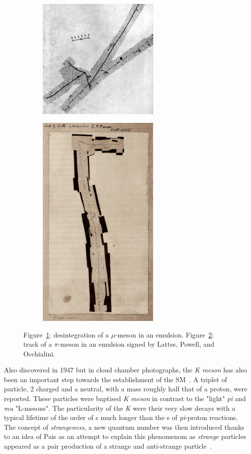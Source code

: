 	\begin{figure}[H]
		\begin{subfigure}{0.5\linewidth}
			\centering
			\includegraphics[width=6cm]{fig/chapt2/mu-meson.png}
			\caption{\label{fig:emulsions:A}}
		\end{subfigure}
		\begin{subfigure}{0.5\linewidth}
			\centering
			\includegraphics[width=6cm]{fig/chapt2/pion-emulsion.pdf}
			\caption{\label{fig:emulsions:B}}
		\end{subfigure}
		\caption{\label{fig:emulsions} Figure~\ref{fig:emulsions:A}: desintegration of a $\mu$-meson in an emulsion. Figure~\ref{fig:emulsions:B}: track of a $\pi$-meson in an emulsion signed by Lattes, Powell, and Occhialini.}
	\end{figure}
	
	Also discovered in 1947 but in cloud chamber photographs, the \textit{K meson} has also been an important step towards the establishment of the \acl{SM}~\cite{ROCHESTER1947}. A triplet of particle, 2 charged and a neutral, with a mass roughly half that of a proton, were reported. These particles were baptised \textit{K meson} in contrast to the "light" \textit{pi} and \textit{mu} "L-mesons". The particularity of the \textit{K} were their very slow decays with a typical lifetime of the order of \si{s} much longer than the \si{s} of \textit{pi}-proton reactions. The concept of \textit{strangeness}, a new quantum number was then introduced thanks to an idea of Pais as an attempt to explain this phenomenom as \textit{strange} particles appeared as a pair production of a strange and anti-strange particle~\cite{PAIS1952}.
	
